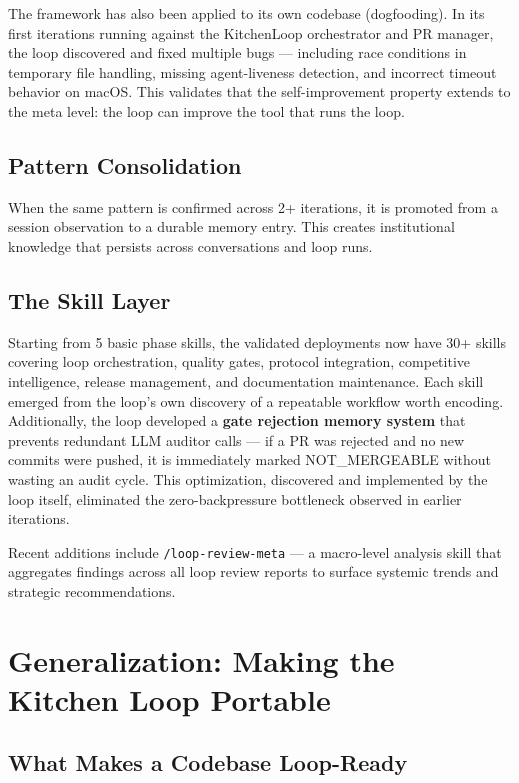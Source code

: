 \documentclass[11pt,a4paper]{article}
\begin{document}
The framework has also been applied to its own codebase (dogfooding). In its first iterations running against the KitchenLoop orchestrator and PR manager, the loop discovered and fixed multiple bugs --- including race conditions in temporary file handling, missing agent-liveness detection, and incorrect timeout behavior on macOS. This validates that the self-improvement property extends to the meta level: the loop can improve the tool that runs the loop.

\subsection{Pattern Consolidation}\label{sec:pattern-consolidation}

When the same pattern is confirmed across 2+ iterations, it is promoted from a session observation to a durable memory entry. This creates institutional knowledge that persists across conversations and loop runs.

\subsection{The Skill Layer}\label{sec:skill-layer}

Starting from 5 basic phase skills, the validated deployments now have 30+ skills covering loop orchestration, quality gates, protocol integration, competitive intelligence, release management, and documentation maintenance. Each skill emerged from the loop's own discovery of a repeatable workflow worth encoding. Additionally, the loop developed a \textbf{gate rejection memory system} that prevents redundant LLM auditor calls --- if a PR was rejected and no new commits were pushed, it is immediately marked NOT\_MERGEABLE without wasting an audit cycle. This optimization, discovered and implemented by the loop itself, eliminated the zero-backpressure bottleneck observed in earlier iterations.

Recent additions include \texttt{/loop-review-meta} --- a macro-level analysis skill that aggregates findings across all loop review reports to surface systemic trends and strategic recommendations.


\section{Generalization: Making the Kitchen Loop Portable}\label{sec:generalization-making-the-kitchen-loop-portable}

\subsection{What Makes a Codebase Loop-Ready}\label{sec:what-makes-a-codebase-loop-ready}
\end{document}
